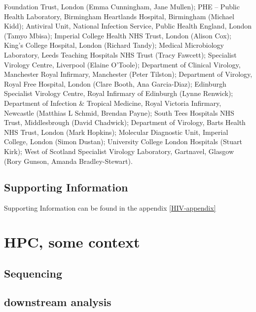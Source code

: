 \documentclass[
  11,
]{scrbook}
\begin{document}
\begin{description}
Foundation Trust, London (Emma Cunningham, Jane Mullen); PHE --
Public Health Laboratory, Birmingham Heartlands Hospital, Birmingham
(Michael Kidd); Antiviral Unit, National Infection Service, Public
Health England, London (Tamyo Mbisa); Imperial College Health NHS
Trust, London (Alison Cox); King's College Hospital, London (Richard
Tandy); Medical Microbiology Laboratory, Leeds Teaching Hospitals
NHS Trust (Tracy Fawcett); Specialist Virology Centre, Liverpool
(Elaine O'Toole); Department of Clinical Virology, Manchester Royal
Infirmary, Manchester (Peter Tilston); Department of Virology, Royal
Free Hospital, London (Clare Booth, Ana Garcia-Diaz); Edinburgh
Specialist Virology Centre, Royal Infirmary of Edinburgh (Lynne
Renwick); Department of Infection \& Tropical Medicine, Royal
Victoria Infirmary, Newcastle (Matthias L Schmid, Brendan Payne);
South Tees Hospitals NHS Trust, Middlesbrough (David Chadwick);
Department of Virology, Barts Health NHS Trust, London (Mark
Hopkins); Molecular Diagnostic Unit, Imperial College, London (Simon
Dustan); University College London Hospitals (Stuart Kirk); West of
Scotland Specialist Virology Laboratory, Gartnavel, Glasgow (Rory
Gunson, Amanda Bradley-Stewart).
\end{description}

\hypertarget{supporting-information}{%
\section*{Supporting Information}\label{supporting-information}}

Supporting Information can be found in the appendix \ref{HIV-appendix}

\printbibliography[segment=\therefsegment,heading=subbibintoc,title={References for chapter \thechapter}]

\hypertarget{hpc-some-context}{%
\chapter{HPC, some context}\label{hpc-some-context}}

\hypertarget{sequencing}{%
\section{Sequencing}\label{sequencing}}

\hypertarget{downstream-analysis}{%
\section{downstream analysis}\label{downstream-analysis}}
\end{document}

